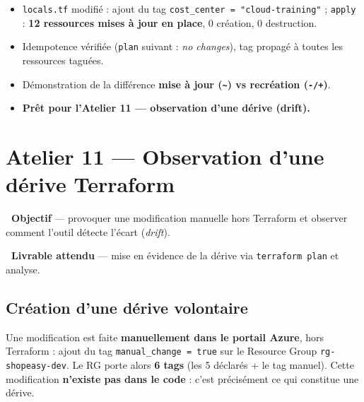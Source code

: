 \documentclass[11pt,a4paper]{article}
\newcommand{\emo}[1]{\raisebox{-0.14em}{\twemoji{#1}}}
\newcommand{\eTarget}{\emo{1f3af}}
\newcommand{\ePackage}{\emo{1f4e6}}
\newcommand{\code}[1]{\texttt{#1}}
\begin{document}
\begin{etatbox}
\begin{itemize}
  \item \code{locals.tf} modifié : ajout du tag \code{cost\_center = "cloud-training"} ; \code{apply} : \textbf{12 ressources mises à jour en place}, 0 création, 0 destruction.
  \item Idempotence vérifiée (\code{plan} suivant : \textit{no changes}), tag propagé à toutes les ressources taguées.
  \item Démonstration de la différence \textbf{mise à jour (\code{\textasciitilde}) vs recréation (\code{-/+})}.
  \item \textbf{Prêt pour l'Atelier 11 — observation d'une dérive (drift).}
\end{itemize}
\end{etatbox}


\section{Atelier 11 — Observation d'une dérive Terraform}

\begin{fiche}
\textbf{\eTarget~Objectif} — provoquer une modification manuelle hors Terraform et observer comment l'outil détecte l'écart (\textit{drift}).

\textbf{\ePackage~Livrable attendu} — mise en évidence de la dérive via \code{terraform plan} et analyse.
\end{fiche}

\subsection{Création d'une dérive volontaire}
Une modification est faite \textbf{manuellement dans le portail Azure}, hors Terraform : ajout du tag
\code{manual\_change = true} sur le Resource Group \code{rg-shopeasy-dev}. Le RG porte alors \textbf{6 tags}
(les 5 déclarés + le tag manuel). Cette modification \textbf{n'existe pas dans le code} : c'est précisément ce
qui constitue une dérive.
\end{document}

